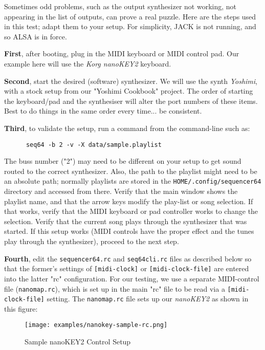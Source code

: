    Sometimes odd problems, such as the output synthesizer not working, not
   appearing in the list of outputs, can prove a real puzzle.
   Here are the steps used in this test; adapt them to your setup.  For
   simplicity, JACK is not running, and so ALSA is in force.

   \textbf{First}, after booting, plug in the MIDI keyboard or MIDI control
   pad.  Our example here will use the \textsl{Korg nanoKEY2} keyboard.  

   \textbf{Second}, start the desired (software) synthesizer.  We will use the
   synth \textsl{Yoshimi}, with a stock setup from our "Yoshimi Cookbook"
   project.  The order of starting the keyboard/pad and the synthesiser
   will alter the port numbers of these items.  Best to do things in the same
   order every time... be consistent.

   \textbf{Third}, to validate the setup, run a command from the command-line
   such as:

   \begin{verbatim}
      seq64 -b 2 -v -X data/sample.playlist
   \end{verbatim}

   The buss number ("2") may need to be different on your setup to get sound
   routed to the correct synthesizer.  Also, the path to the playlist might
   need to be an absolute path; normally playlists are stored in the
   \texttt{HOME/.config/sequencer64} directory and accessed from there.
   Verify that the main window shows the playlist name, and that the arrow keys
   modify the play-list or song selection.  If that works, verify that the MIDI
   keyboard or pad controller works to change the selection.
   Verify that the current song plays through the synthesizer that was started.
   If this setup works (MIDI controls have the proper effect and the tunes play
   through the synthesizer), proceed to the next step.

   \textbf{Fourth}, edit the \texttt{sequencer64.rc} and \texttt{seq64cli.rc}
   files as described below so that the former's settings of
   \texttt{[midi-clock]} or \texttt{[midi-clock-file]} are entered into the
   latter "rc" configuration.
   For our testing, we use a separate MIDI-control file 
   (\texttt{nanomap.rc}), which is set up
   in the main "rc" file to be read via a \texttt{[midi-clock-file]}
   setting.  The \texttt{nanomap.rc} file sets up our \textsl{nanoKEY2} as
   shown in this figure:

\begin{figure}[H]
   \centering 
   \texttt{[image: examples/nanokey-sample-rc.png]}
   \caption{Sample nanoKEY2 Control Setup}
   \label{fig:headless_nanokey2_setup}
\end{figure}

